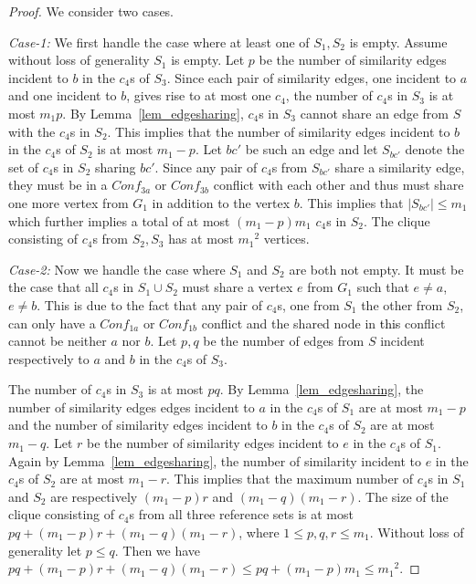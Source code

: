 \documentclass[final]{dmtcs-episciences}
\newcommand\mar[1]{\textcolor{black}{#1}}
\begin{document}
\begin{proof} 
We consider two cases. 

 \emph{ Case-1:} We first handle the case where at least one of $S_1, S_2$ is empty. 
Assume without loss of generality $S_1$ is empty. Let $p$ be the number of similarity edges
incident to $b$ in the $c_4$s of $S_3$. Since each pair of similarity edges, one incident to $a$ and one
incident to $b$, gives rise to at most 
one $c_4$, the number of $c_4$s in $S_3$ is at most $m_1p$. 
By Lemma~\ref{lem_edgesharing}, $c_4$s in $S_3$
cannot share an edge from $S$ with the $c_4$s in $S_2$. This implies that the 
number of similarity  edges incident to $b$ in the $c_4$s of $S_2$ is at most $m_1-p$. 
Let $bc'$ be such an edge and let $S_{bc'}$ denote the set of $c_4$s in $S_2$ sharing $bc'$. Since any pair of $c_4$s from $S_{bc'}$ share a similarity edge, they 
must be in a $Conf_{3a}$ or  $Conf_{3b}$ conflict with each other
and thus must share one more vertex from $G_1$
in addition to the vertex $b$. This implies that $|S_{bc'}|\leq m_1$ which further implies a total of at most $(m_1-p)m_1$ $c_4$s in $S_2$. 
The clique consisting of $c_4$s from $S_2, S_3$ has at most ${m_1}^2$ vertices. 

 \emph{ Case-2:} Now we handle the case where $S_1$ and $S_2$ are both not empty. 
It must be the case that all $c_4$s in $S_1\cup S_2$ must share a vertex $e$ from $G_1$
such that $e\neq a$, $e\neq b$. This is due to the fact that any pair of $c_4$s, one from $S_1$ the other from $S_2$,
can only have a $Conf_{1a}$ or $Conf_{1b}$ conflict and the shared node in \mar{this} conflict cannot be neither $a$ nor $b$. 
Let $p,q$ be the number of edges from $S$ incident respectively to $a$ and $b$ in the $c_4$s of $S_3$. 

The number of $c_4$s in $S_3$ is at most $pq$. 
By Lemma~\ref{lem_edgesharing}, the 
number of similarity edges edges incident to $a$ in the $c_4$s of $S_1$ are at most $m_1-p$ and 
the number of similarity edges incident to $b$ in the $c_4$s of $S_2$ are at most $m_1-q$.
Let $r$ be the number of 
similarity edges incident to $e$ in the $c_4$s of $S_1$. Again by Lemma~\ref{lem_edgesharing},
the number of similarity incident to $e$ in the $c_4$s of $S_2$ are at most $m_1-r$.
This implies that the maximum number of $c_4$s in $S_1$ and $S_2$ are respectively $(m_1-p)r$
and $(m_1-q)(m_1-r)$. The size of the clique consisting of 
$c_4$s from all three reference sets 
is at most $pq+(m_1-p)r+(m_1-q)(m_1-r)$, where $1\leq p,q,r\leq m_1$.
Without loss of generality let $p\leq q$. Then we have
$pq+(m_1-p)r+(m_1-q)(m_1-r)\leq pq+(m_1-p)m_1 \leq {m_1}^2$.
\end{proof}
\end{document}
